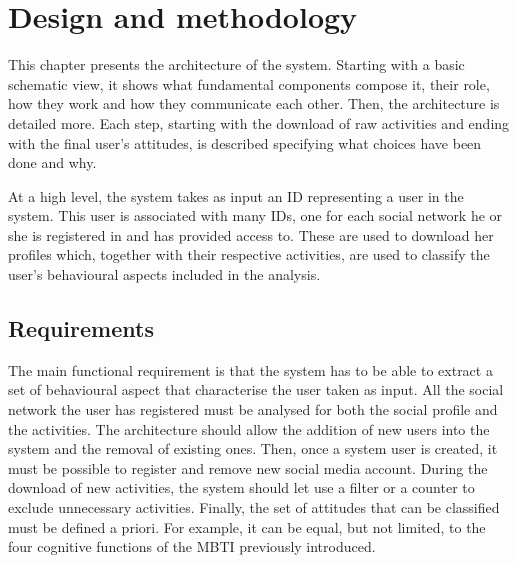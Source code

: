 \chapter{Design and methodology}
This chapter presents the architecture of the system. Starting with a basic schematic view, it shows what fundamental components compose it, their role, how they work and how they communicate each other.
Then, the architecture is detailed more. Each step, starting with the download of raw activities and ending with the final user's attitudes, is described specifying what choices have been done and why.

At a high level, the system takes as input an ID representing a user in the system.
This user is associated with many IDs, one for each social network he or she is registered in and has provided access to.
These are used to download her profiles which, together with their respective activities, are used to classify the user's behavioural aspects included in the analysis.

\section{Requirements}
The main functional requirement is that the system has to be able to extract a set of behavioural aspect that characterise the user taken as input.
All the social network the user has registered must be analysed for both the social profile and the activities.
The architecture should allow the addition of new users into the system and the removal of existing ones. Then, once a system user is created, it must be possible to register and remove new social media account.
During the download of new activities, the system should let use a filter or a counter to exclude unnecessary activities.
Finally, the set of attitudes that can be classified must be defined a priori. For example, it can be equal, but not limited, to the four cognitive functions of the MBTI previously introduced.

